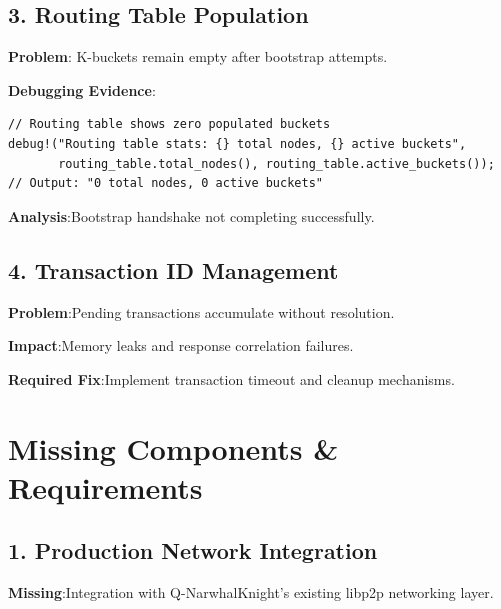 \documentclass[11pt,a4paper]{article}
\begin{document}
\subsection{3. Routing Table Population}

\textbf{Problem}: K-buckets remain empty after bootstrap attempts.

\textbf{Debugging Evidence}:
\begin{lstlisting}
// Routing table shows zero populated buckets
debug!("Routing table stats: {} total nodes, {} active buckets",
       routing_table.total_nodes(), routing_table.active_buckets());
// Output: "0 total nodes, 0 active buckets"
\end{lstlisting}

\textbf{Analysis}:Bootstrap handshake not completing successfully.

\subsection{4. Transaction ID Management}

\textbf{Problem}:Pending transactions accumulate without resolution.

\textbf{Impact}:Memory leaks and response correlation failures.

\textbf{Required Fix}:Implement transaction timeout and cleanup mechanisms.

\section{Missing Components \& Requirements}

\subsection{1. Production Network Integration}

\textbf{Missing}:Integration with Q-NarwhalKnight's existing libp2p networking layer.
\end{document}
